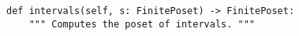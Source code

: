 \begin{verbatim}
def intervals(self, s: FinitePoset) -> FinitePoset:
    """ Computes the poset of intervals. """
\end{verbatim}